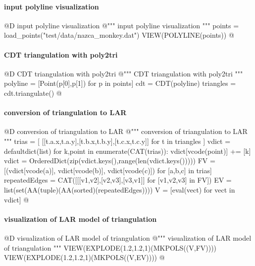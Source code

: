\documentclass[11pt,oneside]{article}    %
\begin{document}
\paragraph{input polyline visualization}
@D input polyline visualization
@{""" input polyline visualization """
points = load_points("test/data/nazca_monkey.dat")
VIEW(POLYLINE(points))
@}

\paragraph{CDT triangulation with poly2tri}
@D CDT triangulation with poly2tri
@{""" CDT triangulation with poly2tri """
polyline = [Point(p[0],p[1]) for p in points]  
cdt = CDT(polyline)
triangles = cdt.triangulate()
@}
  
\paragraph{conversion of triangulation to LAR}
@D conversion of triangulation to LAR
@{""" conversion of triangulation to LAR """
trias = [ [[t.a.x,t.a.y],[t.b.x,t.b.y],[t.c.x,t.c.y]] for t in triangles ]
vdict = defaultdict(list)
for k,point in enumerate(CAT(trias)): 
    vdict[vcode(point)] += [k]
vdict = OrderedDict(zip(vdict.keys(),range(len(vdict.keys()))))
FV = [(vdict[vcode(a)], vdict[vcode(b)], vdict[vcode(c)]) for [a,b,c] in trias] 
repeatedEdges = CAT([[[v1,v2],[v2,v3],[v3,v1]] for [v1,v2,v3] in FV])
EV = list(set(AA(tuple)(AA(sorted)(repeatedEdges))))
V = [eval(vect) for vect in vdict]
@}

\paragraph{visualization of LAR model of triangulation}
@D visualization of LAR model of triangulation
@{""" visualization of LAR model of triangulation """
VIEW(EXPLODE(1.2,1.2,1)(MKPOLS((V,FV))))
VIEW(EXPLODE(1.2,1.2,1)(MKPOLS((V,EV))))
@}
\end{document}
